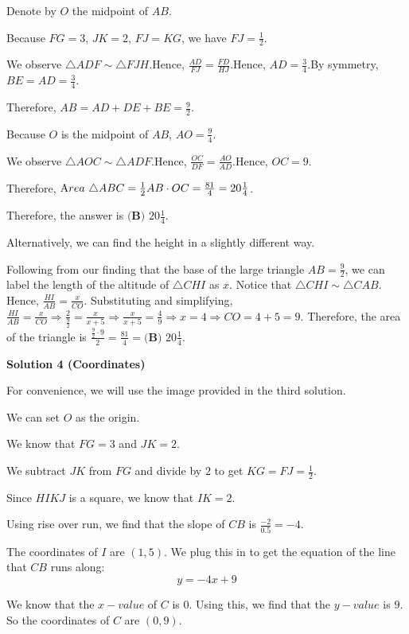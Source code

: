 \begin{enumerate}
 Denote by $O$ the midpoint of $AB$.

 Because $FG = 3$, $JK = 2$, $FJ = KG$, we have $FJ = \frac{1}{2}$.

 We observe $\triangle ADF \sim \triangle FJH$.Hence, $\frac{AD}{FJ} = \frac{FD}{HJ}$.Hence, $AD = \frac{3}{4}$.By symmetry, $BE = AD = \frac{3}{4}$.

 Therefore, $AB = AD + DE + BE = \frac{9}{2}$.

 Because $O$ is the midpoint of $AB$, $AO = \frac{9}{4}$.

 We observe $\triangle AOC \sim \triangle ADF$.Hence, $\frac{OC}{DF} = \frac{AO}{AD}$.Hence, $OC = 9$.

 Therefore, ${\textrm Area} \ \triangle ABC = \frac{1}{2} AB \cdot OC = \frac{81}{4} = 20 \frac{1}{4}$.

 Therefore, the answer is $\boxed{\textbf{(B) }20 \frac{1}{4}}$.

 Alternatively, we can find the height in a slightly different way.

 Following from our finding that the base of the large triangle $AB = \frac{9}{2}$, we can label the length of the altitude of $\triangle{CHI}$ as $x$. Notice that $\triangle{CHI} \sim \triangle{CAB}$. Hence, $\frac{HI}{AB} = \frac{x}{CO}$. Substituting and simplifying, $\frac{HI}{AB} = \frac{x}{CO} \Rightarrow \frac{2}{\frac{9}{2}} = \frac{x}{x+5} \Rightarrow \frac{x}{x+5} = \frac{4}{9} \Rightarrow x = 4 \Rightarrow CO = 4 + 5 = 9$. Therefore, the area of the triangle is $\frac{\frac{9}{2} \cdot 9}{2} = \frac{81}{4} = \boxed{\textbf{(B) }20 \frac{1}{4}}$.

 



\textbf{Solution 4 (Coordinates)}

For convenience, we will use the image provided in the third solution.

 We can set $O$ as the origin.

 We know that $FG = 3$ and $JK = 2$. 

 We subtract $JK$ from $FG$ and divide by $2$ to get $KG = FJ = \frac{1}{2}$. 

 Since $HIKJ$ is a square, we know that $IK = 2$. 

 Using rise over run, we find that the slope of $CB$ is $\frac{-2}{0.5} = -4$.

 The coordinates of $I$ are $(1, 5)$. We plug this in to get the equation of the line that $CB$ runs along: 
 \[y = -4x + 9\] 

 We know that the $x-value$ of $C$ is $0$. Using this, we find that the $y-value$ is $9$. So the coordinates of $C$ are $(0, 9)$. 


\end{enumerate}
